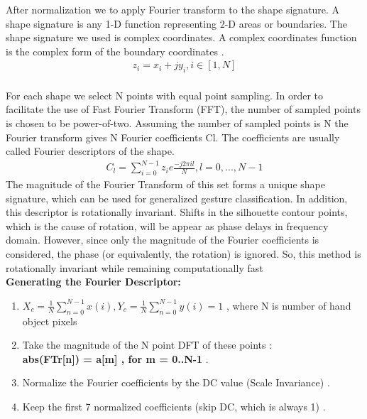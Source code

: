After normalization we to apply Fourier transform to the
shape signature. A shape signature is any 1-D function
representing 2-D areas or boundaries. The shape signature we
used is complex coordinates. A complex coordinates function
is the complex form of the boundary coordinates \cite{20}. \\
\begin{gather}
    z_{i} = x_{i}+j y_{i} , i\in [1,N]
\end{gather}\\
For each shape we select N points with equal point
sampling. In order to facilitate the use of Fast Fourier
Transform (FFT), the number of sampled points is chosen to
be power-of-two. Assuming the number of sampled points is
N the Fourier transform gives N Fourier coefficients Cl. The
coefficients are usually called Fourier descriptors of the shape. 
\begin{gather}
C_{l}= \sum_{i=0}^{N-1} z_{i}e{\frac{-j 2\pi il}{N}} , l = 0,...,N-1
\end{gather}
The magnitude of the Fourier
Transform of this set forms a unique shape signature, which can be used for generalized
gesture classification.
In addition, this descriptor is rotationally invariant. Shifts in the silhouette contour
points, which is the cause of rotation, will be appear as phase delays in frequency
domain. However, since only the magnitude of the Fourier coefficients is considered,
the phase (or equivalently, the rotation) is ignored. So, this method is rotationally
invariant while remaining computationally fast\\


\textbf{Generating the Fourier Descriptor: }\\
\begin{enumerate}
    \item $X_{c} = \frac{1}{N}\sum_{n=0}^{N-1} x(i) , Y_{c} = \frac{1}{N}\sum_{n=0}^{N-1} y(i)  = 1$ , where N is number of hand object pixels 
    \item Take the magnitude of the N point DFT of these points :\\
              \textbf{ abs(FT{r[n]}) = a[m] , for m = 0..N-1 }.
    \item Normalize the Fourier coefficients by the DC value (Scale Invariance) .
    \item Keep the first 7 normalized coefficients (skip DC, which is always 1) .

\end{enumerate}


